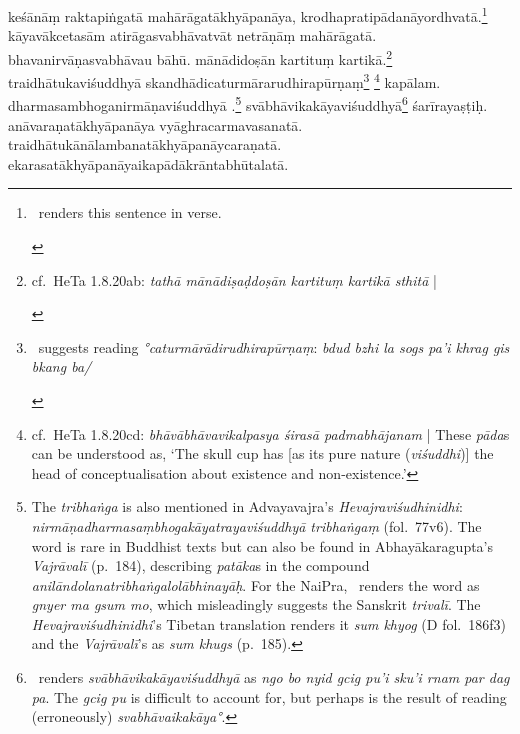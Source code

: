 \documentclass[naipra.tex]{subfiles}
\begin{document}
\begin{sanskrit}
\medskip\pstart
keśānāṃ raktapiṅgatā mahārāgatākhyāpanāya, krodhapratipādanāyordhvatā.\footnote{\begin{english}
	\TIB\ renders this sentence in verse.
\end{english}}
kāyavākcetasām atirāgasvabhāvatvāt  netrāṇāṃ mahārāgatā.
bhavanirvāṇasvabhāvau bāhū.
mānādidoṣān kartituṃ kartikā.\footnote{
	\begin{english}%
		cf.\ HeTa 1.8.20ab: \emph{tathā mānādiṣaḍdoṣān kartituṃ kartikā sthitā} |
	\end{english}
}
traidhātukaviśuddhyā skandhādicaturmārarudhirapūrṇaṃ\footnote{
	\begin{english}%
		\TIB\ suggests reading \emph{°caturmārādirudhirapūrṇaṃ}: \emph{bdud bzhi la sogs pa'i khrag gis bkang ba/} 
	\end{english}
}  \footnote{
	cf.\ HeTa 1.8.20cd: \emph{bhāvābhāvavikalpasya śirasā padmabhājanam} | These \emph{pāda}s can be understood as, `The skull cup has [as its pure nature (\emph{viśuddhi})] the head of conceptualisation about existence and non-existence.'
} kapālam.
dharmasambhoganirmāṇaviśuddhyā .\footnote{
	The \emph{tribhaṅga} is also mentioned in Advayavajra's \emph{Hevajraviśudhinidhi}: \emph{nirmāṇadharmasaṃbhogakāyatrayaviśuddhyā tribhaṅgaṃ} (fol.\ 77v6).
	The word is rare in Buddhist texts but can also be found in Abhayākaragupta's \emph{Vajrāvalī} (p.\ 184), describing \emph{patāka}s in the compound \emph{anilāndolanatribhaṅgalolābhinayāḥ}.
	For the NaiPra, \TIB\ renders the word as \emph{gnyer ma gsum mo}, which misleadingly suggests the Sanskrit \emph{trivalī}.
	The \emph{Hevajraviśudhinidhi}'s Tibetan translation renders it \emph{sum khyog} (D fol.\ 186f3) and the \emph{Vajrāvalī}'s as \emph{sum khugs} (p.\ 185).
} %
svābhāvikakāyaviśuddhyā\footnote{
	\TIB\ renders \emph{svābhāvikakāyaviśuddhyā} as \emph{ngo bo nyid gcig pu'i sku'i rnam par dag pa}. 
	The \emph{gcig pu} is difficult to account for, but perhaps is the result of reading (erroneously) \emph{svabhāvaikakāya°}.
} śarīrayaṣṭiḥ.
anāvaraṇatākhyāpanāya vyāghracarmavasanatā.
traidhātukānālambanatākhyāpanāy\crux {}\crux caraṇatā.
ekarasatākhyāpanāyaikapādākrāntabhūtalatā.
\pend


\end{sanskrit}
\end{document}
